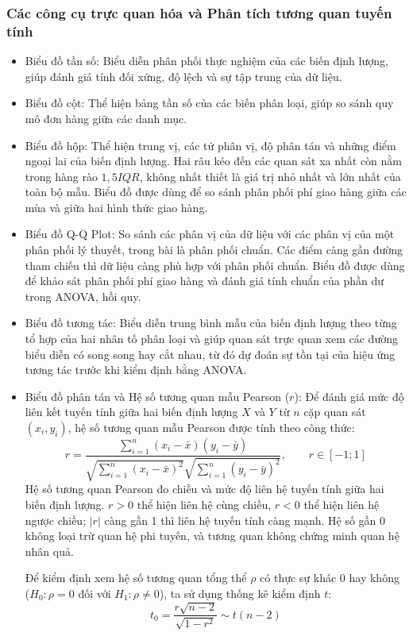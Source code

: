 	\subsubsection{Các công cụ trực quan hóa và Phân tích tương quan tuyến tính}
	
	\begin{itemize}
		\item Biểu đồ tần số: Biểu diễn phân phối thực nghiệm của các biến định lượng, giúp đánh giá tính đối xứng, độ lệch và sự tập trung của dữ liệu.
		\item Biểu đồ cột: Thể hiện bảng tần số của các biến phân loại, giúp so sánh quy mô đơn hàng giữa các danh mục.
		\item Biểu đồ hộp: Thể hiện trung vị, các tứ phân vị, độ phân tán và những điểm ngoại lai của biến định lượng. Hai râu kéo đến các quan sát xa nhất còn nằm trong hàng rào $1{,}5IQR$, không nhất thiết là giá trị nhỏ nhất và lớn nhất của toàn bộ mẫu. Biểu đồ được dùng để so sánh phân phối phí giao hàng giữa các mùa và giữa hai hình thức giao hàng.
		\item Biểu đồ Q-Q Plot: So sánh các phân vị của dữ liệu với các phân vị của một phân phối lý thuyết, trong bài là phân phối chuẩn. Các điểm càng gần đường tham chiếu thì dữ liệu càng phù hợp với phân phối chuẩn. Biểu đồ được dùng để khảo sát phân phối phí giao hàng và đánh giá tính chuẩn của phần dư trong ANOVA, hồi quy.
		\item Biểu đồ tương tác: Biểu diễn trung bình mẫu của biến định lượng theo từng tổ hợp của hai nhân tố phân loại và giúp quan sát trực quan xem các đường biểu diễn có song song hay cắt nhau, từ đó dự đoán sự tồn tại của hiệu ứng tương tác trước khi kiểm định bằng ANOVA.
		\item Biểu đồ phân tán và Hệ số tương quan mẫu Pearson ($r$): Để đánh giá mức độ liên kết tuyến tính giữa hai biến định lượng $X$ và $Y$ từ $n$ cặp quan sát $(x_i, y_i)$, hệ số tương quan mẫu Pearson được tính theo công thức:
		\begin{equation}
			r = \frac{\sum_{i=1}^{n} (x_i - \bar{x})(y_i - \bar{y})}{\sqrt{\sum_{i=1}^{n} (x_i - \bar{x})^2} \sqrt{\sum_{i=1}^{n} (y_i - \bar{y})^2}}, \qquad r \in [-1; 1]
		\end{equation}
		Hệ số tương quan Pearson đo chiều và mức độ liên hệ tuyến tính giữa hai biến định lượng. $r>0$ thể hiện liên hệ cùng chiều, $r<0$ thể hiện liên hệ ngược chiều; $|r|$ càng gần 1 thì liên hệ tuyến tính càng mạnh. Hệ số gần 0 không loại trừ quan hệ phi tuyến, và tương quan không chứng minh quan hệ nhân quả.
		
		Để kiểm định xem hệ số tương quan tổng thể $\rho$ có thực sự khác 0 hay không ($H_0: \rho = 0$ đối với $H_1: \rho \neq 0$), ta sử dụng thống kê kiểm định $t$:
		\begin{equation}
			t_0 = \frac{r\sqrt{n - 2}}{\sqrt{1 - r^2}} \sim t(n - 2)
		\end{equation}
	\end{itemize}
	
